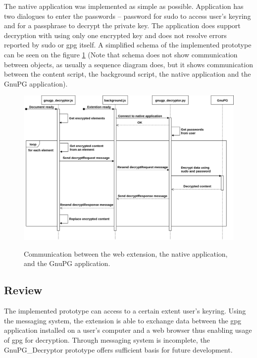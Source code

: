 The native application was implemented as simple as possible. Application has two dialogues to enter the passwords -- password for sudo to access user's keyring and for a passphrase to decrypt the private key. The application does support decryption with using only one encrypted key and does not resolve errors reported by sudo or gpg itself. A simplified schema of the implemented prototype can be seen on the figure \ref{img:gnupg_decryptor-sequence} (Note that schema does not show communication between objects, as usually a sequence diagram does, but it shows communication between the content script, the background script, the native application and the GnuPG application).

\begin{figure}[H]
    \begin{center}
        \label{img:gnupg_decryptor-sequence}
        \includegraphics[width=1.3\textwidth,angle=90]{obrazky-figures/sequence-gnupg_decryptor.png}
        \caption{Communication between the web extension, the native application, and the GnuPG application.}
    \end{center}
\end{figure}

\subsection{Review}
The implemented prototype can access to a certain extent user's keyring. Using the messaging system, the extension is able to exchange data between the gpg application installed on a user's computer and a web browser thus enabling usage of gpg for decryption. Through messaging system is incomplete, the GnuPG\_Decryptor prototype offers sufficient basis for future development.

